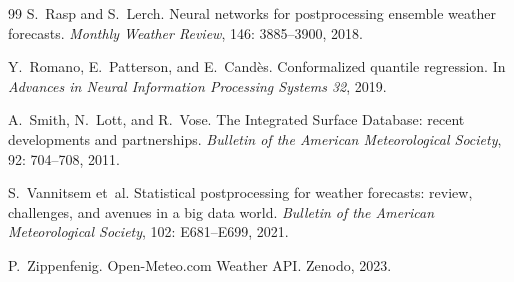 \documentclass{article}
\begin{document}
\begin{thebibliography}{99}
S.~Rasp and S.~Lerch.
\newblock Neural networks for postprocessing ensemble weather forecasts.
\newblock \emph{Monthly Weather Review}, 146: 3885--3900, 2018.

Y.~Romano, E.~Patterson, and E.~Cand\`es.
\newblock Conformalized quantile regression.
\newblock In \emph{Advances in Neural Information Processing Systems 32}, 2019.

A.~Smith, N.~Lott, and R.~Vose.
\newblock The Integrated Surface Database: recent developments and partnerships.
\newblock \emph{Bulletin of the American Meteorological Society}, 92: 704--708, 2011.

S.~Vannitsem et~al.
\newblock Statistical postprocessing for weather forecasts: review, challenges, and avenues in a big data world.
\newblock \emph{Bulletin of the American Meteorological Society}, 102: E681--E699, 2021.

P.~Zippenfenig.
\newblock Open-Meteo.com Weather API.
\newblock Zenodo, 2023.

\end{thebibliography}
\end{document}
